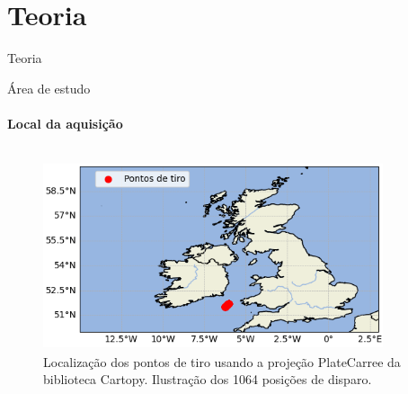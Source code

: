 \documentclass[xcolor=dvipsnames,t]{beamer}
\begin{document}
\section{Teoria}
\begin{frame}{}
	\bigskip\bigskip\bigskip\bigskip\bigskip\bigskip
	\begin{center}
		\Huge Teoria
	\end{center}    
\end{frame}
\begin{frame}{Área de estudo}
\framesubtitle{Local da aquisição}	

\pause	
\begin{columns}[onlytextwidth, T]
	\begin{column}{.90\textwidth}
		\begin{figure}[h]
			\includegraphics[width=10cm,height=5.5cm]{../imagens/area_de_estudo.png}	
			\tiny{\caption{Localização dos pontos de tiro usando a projeção Plate\newline Carree da biblioteca Cartopy. Ilustração dos 1064 posições de disparo.}} 	
			\label{pontosDeTiro}
		\end{figure}	
	\end{column}
\end{columns}	
	
\end{frame}
\end{document}

